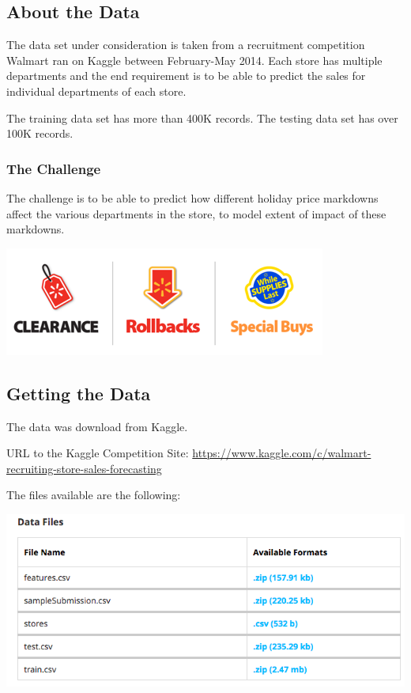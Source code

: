 \documentclass[]{article}
\begin{document}
\subsection{About the Data}\label{about-the-data}

The data set under consideration is taken from a recruitment competition
Walmart ran on Kaggle between February-May 2014. Each store has multiple
departments and the end requirement is to be able to predict the sales
for individual departments of each store.

The training data set has more than 400K records. The testing data set
has over 100K records.

\subsubsection{The Challenge}\label{the-challenge}

The challenge is to be able to predict how different holiday price
markdowns affect the various departments in the store, to model extent
of impact of these markdowns.

\includegraphics{markdowns}

\subsection{Getting the Data}\label{getting-the-data}

The data was download from Kaggle.

URL to the Kaggle Competition Site:
\url{https://www.kaggle.com/c/walmart-recruiting-store-sales-forecasting}

The files available are the following:

\includegraphics[scale=.5]{DataFilesImage}
\end{document}
